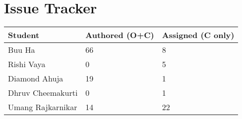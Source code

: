 \documentclass{article}
\begin{document}
\section{Issue Tracker}

\begin{table}[H]
\centering
\begin{tabular}{lll}
\toprule
\textbf{Student} & \textbf{Authored (O+C)} & \textbf{Assigned (C only)}\\
\midrule
Buu Ha & 66 & 8 \\
Rishi Vaya & 0 & 5 \\
Diamond Ahuja & 19 & 1 \\
Dhruv Cheemakurti & 0 & 1 \\
Umang Rajkarnikar & 14 & 22 \\
\bottomrule
\end{tabular}
\end{table}
\end{document}
